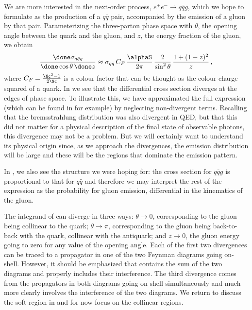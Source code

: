 We are more interested in the next-order process, $e^+e^-\to q\bar{q}g$,
which we hope to formulate as the production of a $q\bar{q}$ pair,
accompanied by the emission of a gluon by that pair.  Parameterizing the
three-parton phase space with $\theta$, the opening angle between the
quark and the gluon, and $z$, the energy fraction of the gluon, we
obtain
\begin{equation}
  \label{sigmaeeqqg2}
  \frac{\done\sigma_{q\bar qg}}{\done\cos\theta\,\done z} \approx
  \sigma_{q\bar q} \, C_F \, \frac{\alphaS}{2\pi} \,
  \frac2{\sin^2\theta}\,\frac{1+(1-z)^2}z\,,
\end{equation}
where $C_F=\frac{\Nc^2-1}{2\Nc}$ is a colour factor that can be thought as
the colour-charge squared of a quark.  In  we see
that the differential cross section diverges at the edges of phase
space.  To illustrate this, we have approximated the full expression
(which can be found in \cite{Ellis:1991qj} for example) by neglecting
non-divergent terms.
Recalling that the bremsstrahlung distribution was also divergent in
QED, but that this did not matter for a physical description of the
final state of observable photons, this divergence may not be a problem.
But we will certainly want to understand its physical origin since, as
we approach the divergences, the emission distribution will be large and
these will be the regions that dominate the emission pattern.

In , we also see the structure we were hoping for: the
cross section for $q\bar{q}g$ is proportional to that for $q\bar{q}$ and
therefore we may interpret the rest of the expression as the probability
for gluon emission, differential in the kinematics of the gluon.

The integrand of  can diverge in three
ways: $\theta\to0$, corresponding to the gluon being collinear to the
quark; $\theta\to\pi$, corresponding to the gluon being back-to-back
with the quark, \ie collinear with the antiquark; and $z\to0$,
the gluon energy going to zero for any value of the opening angle.  Each
of the first two divergences can be traced to a propagator in one of the
two Feynman diagrams going on-shell.  However, it should be emphasized
that  contains the sum of the two diagrams and
properly includes their interference.  The third divergence comes from
the propagators in both diagrams going on-shell simultaneously and much
more clearly involves the interference of the two diagrams.  We return
to discuss the soft region in  and
for now focus on the collinear regions.

